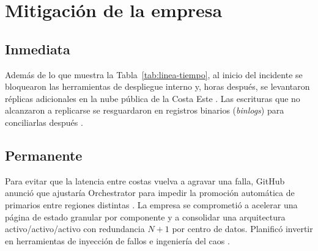 \section{Mitigación de la empresa}
\label{sec:mitigacion}

\subsection{Inmediata}
Además de lo que muestra la Tabla~\ref{tab:linea-tiempo}, al inicio del incidente se bloquearon las herramientas de despliegue interno y, horas después, se levantaron réplicas adicionales en la nube pública de la Costa Este \cite{Warner2018}. Las escrituras que no alcanzaron a replicarse se resguardaron en registros binarios (\textit{binlogs}) para conciliarlas después \cite{Warner2018}.

\subsection{Permanente}
Para evitar que la latencia entre costas vuelva a agravar una falla, GitHub anunció que ajustaría Orchestrator para impedir la promoción automática de primarios entre regiones distintas \cite{Warner2018}. La empresa se comprometió a acelerar una página de estado granular por componente y a consolidar una arquitectura activo/activo/activo con redundancia $N+1$ por centro de datos. Planificó invertir en herramientas de inyección de fallos e ingeniería del caos \cite{Warner2018}.
